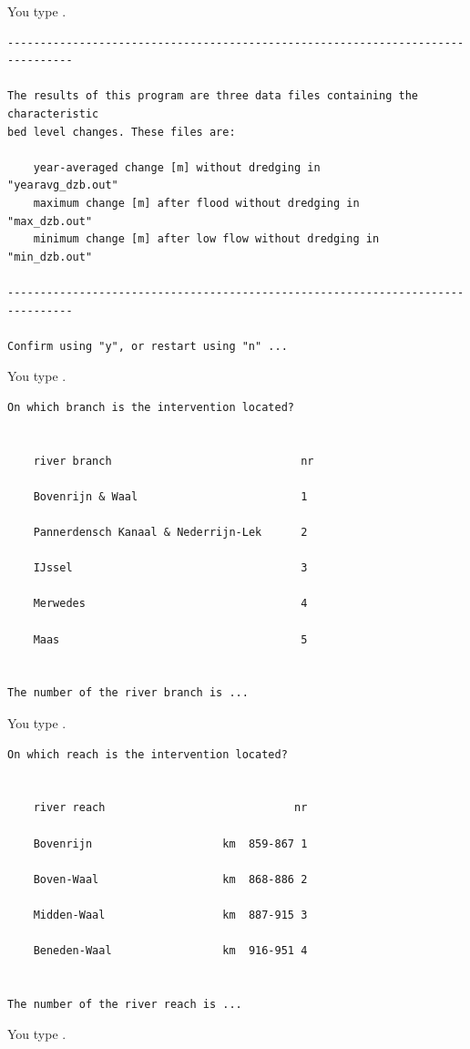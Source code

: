 You type .

\begin{Verbatim}
--------------------------------------------------------------------------------

The results of this program are three data files containing the characteristic
bed level changes. These files are:

    year-averaged change [m] without dredging in          "yearavg_dzb.out"
    maximum change [m] after flood without dredging in    "max_dzb.out"
    minimum change [m] after low flow without dredging in "min_dzb.out"

--------------------------------------------------------------------------------

Confirm using "y", or restart using "n" ...
\end{Verbatim}

You type .

\begin{Verbatim}
On which branch is the intervention located?


    river branch                             nr

    Bovenrijn & Waal                         1

    Pannerdensch Kanaal & Nederrijn-Lek      2

    IJssel                                   3

    Merwedes                                 4

    Maas                                     5


The number of the river branch is ...
\end{Verbatim}

You type .

\begin{Verbatim}
On which reach is the intervention located?


    river reach                             nr

    Bovenrijn                    km  859-867 1

    Boven-Waal                   km  868-886 2

    Midden-Waal                  km  887-915 3

    Beneden-Waal                 km  916-951 4


The number of the river reach is ...
\end{Verbatim}

You type .


